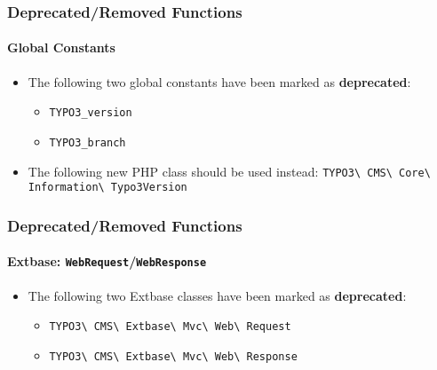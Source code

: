 \begin{frame}[fragile]
	\frametitle{Deprecated/Removed Functions}
	\framesubtitle{Global Constants}

	\lstset{basicstyle=\smaller\ttfamily}

	\begin{itemize}
		\item The following two global constants have been marked as \textbf{deprecated}:

			\begin{itemize}
				\item \texttt{TYPO3\_version}
				\item \texttt{TYPO3\_branch}
			\end{itemize}

		\item The following new PHP class should be used instead:\newline
			\small
				\texttt{TYPO3\textbackslash
					CMS\textbackslash
					Core\textbackslash
					Information\textbackslash
					Typo3Version}\normalsize

	\end{itemize}

\end{frame}


\begin{frame}[fragile]
	\frametitle{Deprecated/Removed Functions}
	\framesubtitle{Extbase: \texttt{WebRequest}/\texttt{WebResponse}}

	\begin{itemize}
		\item The following two Extbase classes have been marked as \textbf{deprecated}:
			\begin{itemize}
				\item \texttt{TYPO3\textbackslash
					CMS\textbackslash
					Extbase\textbackslash
					Mvc\textbackslash
					Web\textbackslash
					Request}
				\item \texttt{TYPO3\textbackslash
					CMS\textbackslash
					Extbase\textbackslash
					Mvc\textbackslash
					Web\textbackslash
					Response}
			\end{itemize}

	\end{itemize}

\end{frame}

